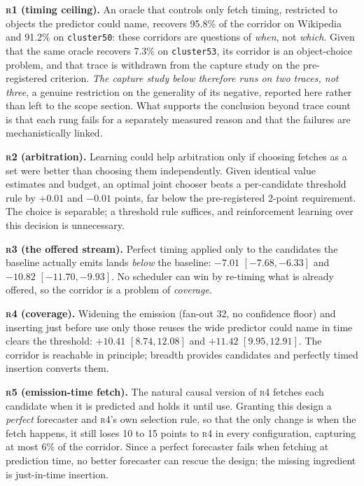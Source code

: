 \documentclass[letterpaper]{article} %
\newcommand{\rung}[1]{\textsc{#1}}
\begin{document}
\textbf{\rung{r1} (timing ceiling).} An oracle that controls only fetch timing, restricted to objects the predictor could name, recovers 95.8\% of the corridor on Wikipedia and 91.2\% on \texttt{cluster50}: these corridors are questions of \emph{when}, not \emph{which}. Given that the same oracle recovers 7.3\% on \texttt{cluster53}, its corridor is an object-choice problem, and that trace is withdrawn from the capture study on the pre-registered criterion. \emph{The capture study below therefore runs on two traces, not three}, a genuine restriction on the generality of its negative, reported here rather than left to the scope section. What supports the conclusion beyond trace count is that each rung fails for a separately measured reason and that the failures are mechanistically linked.

\textbf{\rung{r2} (arbitration).} Learning could help arbitration only if choosing fetches as a set were better than choosing them independently. Given identical value estimates and budget, an optimal joint chooser beats a per-candidate threshold rule by $+0.01$ and $-0.01$ points, far below the pre-registered 2-point requirement. The choice is separable; a threshold rule suffices, and reinforcement learning over this decision is unnecessary.

\textbf{\rung{r3} (the offered stream).} Perfect timing applied only to the candidates the baseline actually emits lands \emph{below} the baseline: $-7.01$ $[-7.68,-6.33]$ and $-10.82$ $[-11.70,-9.93]$. No scheduler can win by re-timing what is already offered, so the corridor is a problem of \emph{coverage}.

\textbf{\rung{r4} (coverage).} Widening the emission (fan-out 32, no confidence floor) and inserting just before use only those reuses the wide predictor could name in time clears the threshold: $+10.41$ $[8.74,12.08]$ and $+11.42$ $[9.95,12.91]$. The corridor is reachable in principle; breadth provides candidates and perfectly timed insertion converts them.

\textbf{\rung{r5} (emission-time fetch).} The natural causal version of \rung{r4} fetches each candidate when it is predicted and holds it until use. Granting this design a \emph{perfect} forecaster and \rung{r4}'s own selection rule, so that the only change is when the fetch happens, it still loses 10 to 15 points to \rung{r4} in every configuration, capturing at most 6\% of the corridor. Since a perfect forecaster fails when fetching at prediction time, no better forecaster can rescue the design; the missing ingredient is just-in-time insertion.
\end{document}
